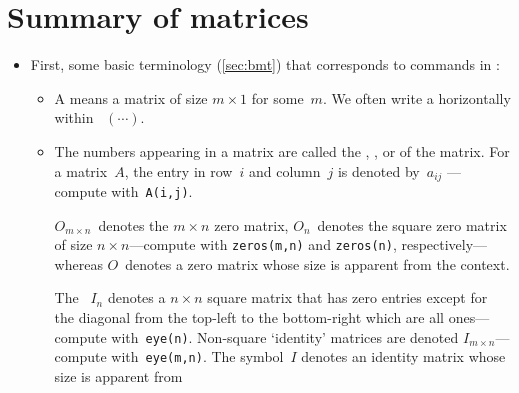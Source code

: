 
\section{Summary of matrices}
\label{sec:summ}

\begin{itemize}
\def\index#1{}%

\subsubsection{Matrix operations and algebra}

\item First, some basic terminology (\cref{sec:bmt}) that corresponds to commands in \script:
\begin{itemize}
\itemhi A  is a rectangular array of real numbers, written inside ~\(\begin{bmatrix} \cdots  \end{bmatrix}\)---create in \script\ via \verb|[...;...;...]|.

\itemhi The  of a matrix is written \(m\times n\) where \(m\)~is the number of rows and \(n\)~is the number of columns---compute with \verb|size(A)| for matrix~\verb|A|.
If \(m=n\)\,, then it is called a .

\item A  means a matrix of size \(m\times 1\) for some~\(m\).
We often write a  horizontally within ~\((\cdots )\).

\item The numbers appearing in a matrix are called the , , or  of the matrix.
For a matrix~\(A\), the entry in row~\(i\) and column~\(j\) is denoted by~\(a_{ij}\) ---compute with~\verb|A(i,j)|.

\itemme \(O_{m\times n}\)~denotes the \(m\times n\) zero matrix, \(O_n\)~denotes the square zero matrix of size \(n\times n\)---compute with \verb|zeros(m,n)| and \verb|zeros(n)|, respectively---whereas \(O\)~denotes a zero matrix whose size is apparent from the context.

\itemme The ~\(I_n\) denotes a \(n\times n\) square matrix that has zero entries except for the diagonal from the top-left to the bottom-right which are all ones---compute with~\index{eye()@\texttt{eye()}}\verb|eye(n)|.
Non-square `identity' matrices are denoted \(I_{m\times n}\)---compute with~\verb|eye(m,n)|.
The symbol~\(I\) denotes an identity matrix whose size is apparent from 


\end{itemize}
\end{itemize}
